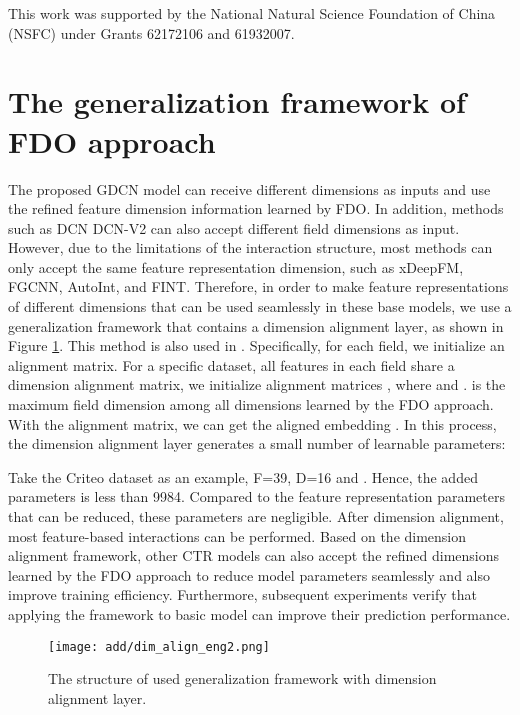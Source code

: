 \documentclass[sigconf]{acmart}
\begin{document}
\begin{acks}
This work was supported by the National Natural Science Foundation of China (NSFC) under Grants 62172106 and 61932007.
\end{acks}

\clearpage

\balance


\clearpage
\appendix
\clearpage{}\section{The generalization framework of FDO approach}
The proposed GDCN model can receive different dimensions as inputs and use the refined feature dimension information learned by FDO. In addition, methods such as DCN DCN-V2 can also accept different field dimensions as input. However, due to the limitations of the interaction structure, most methods can only accept the same feature representation dimension, such as xDeepFM, FGCNN, AutoInt, and FINT. Therefore, in order to make feature representations of different dimensions that can be used seamlessly in these base models, we use a generalization framework that contains a dimension alignment layer, as shown in Figure \ref{fig:framework}. This method is also used in \cite{qu2022sseds, zhao2021autodim}. Specifically, for each field, we initialize an alignment matrix. For a specific dataset, all features in each field share a dimension alignment matrix, we initialize  alignment matrices , where  and .  is the maximum field dimension among all dimensions learned by the FDO approach. With the alignment matrix, we can get the aligned embedding . In this process, the dimension alignment layer generates a small number of learnable parameters:

Take the Criteo dataset as an example, F=39, D=16 and . Hence, the added parameters  is less than 9984. Compared to the feature representation parameters that can be reduced, these parameters are negligible. After dimension alignment, most feature-based interactions can be performed. Based on the dimension alignment framework, other CTR models can also accept the refined dimensions learned by the FDO approach to reduce model parameters seamlessly and also improve training efficiency. Furthermore, subsequent experiments verify that applying the framework to basic model can improve their prediction performance.


\begin{figure}[h]
\centering
    \texttt{[image: add/dim\_align\_eng2.png]}
    \caption{The structure of used generalization framework with dimension alignment layer.}
\label{fig:framework}
\end{figure}
\end{document}
